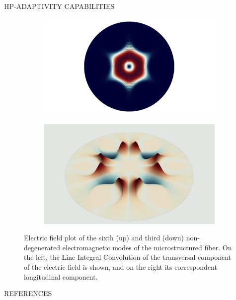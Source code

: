 \documentclass[debug]{beamer} %
\begin{document}
\begin{frame}
\begin{minipage}[t]{0.45\textwidth}
\begin{block}{\boxnumber HP-ADAPTIVITY CAPABILITIES }
\begin{figure}[hb]
\begin{mdframed}[backgroundcolor=bggrey]
					\begin{subfigure}[b]{.4999\textwidth}
						\centering
						\includegraphics[width=1\linewidth]{images/et2posterHoley.png}%
					\end{subfigure}\hfill
					\begin{subfigure}[b]{.4999\textwidth}
						\centering
						\includegraphics[width=1\linewidth]{images/ez2posterHoley.png}%
					\end{subfigure}
				\end{mdframed}
				\caption{Electric field plot of the sixth (up) and third (down) non-degenerated electromagnetic modes of the microstructured fiber. On the left, the Line Integral Convolution of the transversal component of the electric field is shown, and on the right its correspondent longitudinal component.}
				\label{fig:plot-holey}
			\end{figure}
        \end{block}
        \vfill
        \begin{block}{REFERENCES}
        	\printbibliography
        \end{block}
    \end{minipage}
\end{frame}
\end{document}
